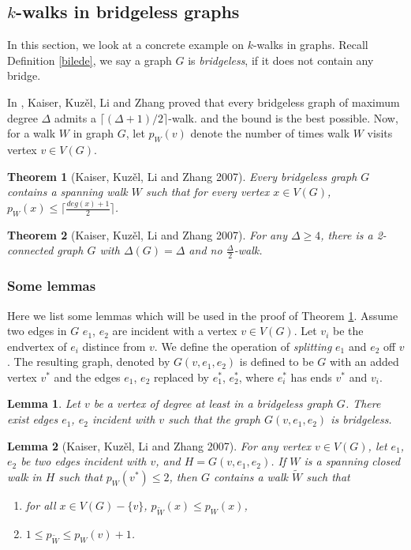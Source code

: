 \documentclass[12pt]{report}
\newtheorem{theorem}{Theorem}
\newtheorem{lemma}{Lemma}
\begin{document}
\subsection{$k$-walks in bridgeless graphs}

In this section, we look at a concrete example on $k$-walks in graphs. Recall Definition \ref{bilede}, we say a graph $G$ is {\em bridgeless}, if it does not contain any bridge. 

In \cite{kaiser2007note}, Kaiser, Kuz{\v{e}}l, Li and Zhang proved that every bridgeless graph of maximum degree $\Delta$ admits a $\lceil(\Delta+1)/2\rceil$-walk. and the bound is the best possible.
Now, for a walk $W$ in graph $G$, let $p_W(v)$ denote the number of times walk $W$ visits vertex $v\in V(G)$.
\begin{theorem}[Kaiser, Kuz{\v{e}}l, Li and Zhang 2007]\label{kwiblgub1}
Every bridgeless graph $G$ contains a spanning walk $W$ such that for every vertex $x\in V(G)$, $p_W(x)\le\lceil\frac{deg(x)+1}{2}\rceil$.

\end{theorem}

\begin{theorem}[Kaiser, Kuz{\v{e}}l, Li and Zhang 2007]\label{kwiblglb2}
For any $\Delta\ge4$, there is a 2-connected graph $G$ with $\Delta(G)=\Delta$ and no $\frac{\Delta}{2}$-walk.
\end{theorem}

\subsubsection{Some lemmas}
Here we list some lemmas which will be used in the proof of Theorem \ref{kwiblgub1}.
Assume two edges in $G$ $e_1$, $e_2$ are incident with a vertex $v\in V(G)$. Let $v_i$ be the endvertex of $e_i$ distince from $v$. We define the operation of {\em splitting} $e_1$ and $e_2$ off $v$. The resulting graph, denoted by $G(v,e_1,e_2)$ is defined to be $G$ with an added vertex $v^*$ and the edges $e_1$, $e_2$ replaced by $e_1^*$, $e_2^*$, where $e_i^*$ has ends $v^*$ and $v_i$. 

\begin{lemma}\label{lm2inbri}
Let $v$ be a vertex of degree at least in a bridgeless graph $G$. There exist edges $e_1$, $e_2$ incident with $v$ such that the graph $G(v,e_1,e_2)$ is bridgeless. 
\end{lemma}


\begin{lemma}[Kaiser, Kuz{\v{e}}l, Li and Zhang 2007]\label{lm3inbri}
For any vertex $v\in V(G)$, let $e_1$, $e_2$ be two edges incident with $v$, and $H=G(v,e_1,e_2)$. If $W$ is a spanning closed walk in $H$ such that $p_W(v^*)\le2$, then $G$ contains a walk $\tilde{W}$ such that
\begin{enumerate}
\item for all $x\in V(G)-\{v\}$, $p_{\tilde{W}}(x)\le p_W(x)$,
\item $1\le p_{\tilde{W}}\le p_W(v)+1$.
\end{enumerate}
\end{lemma}
\end{document}
